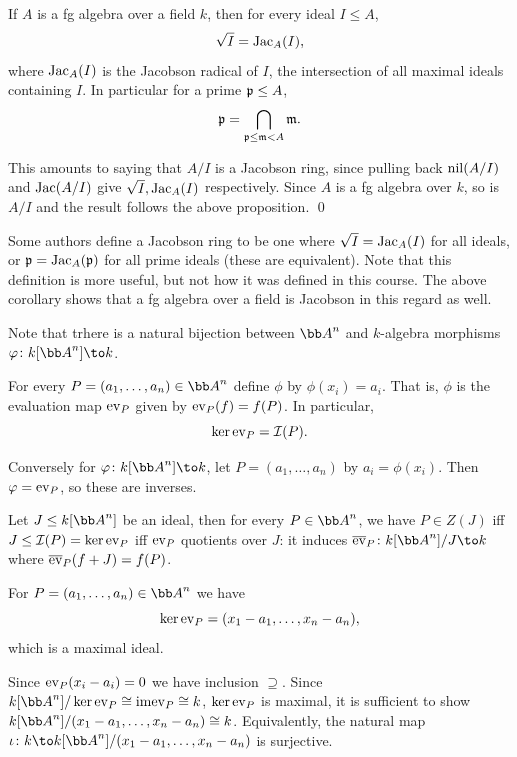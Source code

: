 \eproof

\bcoro

    If $A$ is a fg algebra over a field $k$, then for every ideal $I\leq A$,
    $$ \sqrt I = {\rm Jac}_A(I) , $$
    where ${\rm Jac}_A(I)$ is the Jacobson radical of $I$, the intersection of all maximal ideals containing $I$.
    In particular for a prime ${{\frak p}}\leq A$,
    $$ {{\frak p}} = \bigcap_{{{\frak p}}\leq{{\frak m}}<A}{{\frak m}} . $$

\ecoro

\bproof

    This amounts to saying that $A/I$ is a Jacobson ring, since pulling back ${\rm nil}(A/I)$ and ${\rm Jac}(A/I)$ give $\sqrt I,{\rm Jac}_A(I)$ respectively.
    Since $A$ is a fg algebra over $k$, so is $A/I$ and the result follows the above proposition.
    \qed

\eproof

\bnote

    Some authors define a Jacobson ring to be one where $\sqrt I={\rm Jac}_A(I)$ for all ideals, or ${{\frak p}}={\rm Jac}_A({{\frak p}})$ for all prime ideals (these are equivalent).
    Note that this definition is more useful, but not how it was defined in this course.
    The above corollary shows that a fg algebra over a field is Jacobson in this regard as well.

\enote

Note that trhere is a natural bijection between $\bA^n$ and $k$-algebra morphisms $\phi\colon k[\bA^n]\to k$.
\benum
    \item For every $P=(a_1,\dots,a_n)\in\bA^n$ define $\phi$ by $\phi(x_i)=a_i$.
    That is, $\phi$ is the evaluation map ${\rm ev}_P$ given by ${\rm ev}_P(f)=f(P)$.
    In particular,
    $$ \mathop{\rm ker}{\rm ev}_P = {{\cal I}}(P) . $$
    \item Conversely for $\phi\colon k[\bA^n]\to k$, let $P=(a_1,\dots,a_n)$ by $a_i=\phi(x_i)$.
    Then $\varphi={\rm ev}_P$, so these are inverses.
\eenum

Let $J\leq k[\bA^n]$ be an ideal, then for every $P\in\bA^n$, we have $P\in Z(J)$ iff $J\leq{{\cal I}}(P)=\mathop{\rm ker}{\rm ev}_P$ iff
${\rm ev}_P$ quotients over $J$: it induces $\bar\ev_P\colon k[\bA^n]/J\to k$ where ${\overline{{\rm ev}}}_P(f+J)=f(P)$.

\bprop

    For $P=(a_1,\dots,a_n)\in\bA^n$ we have
    $$ \mathop{\rm ker}{\rm ev}_P = (x_1-a_1,\dots,x_n-a_n) , $$
    which is a maximal ideal.

\eprop

\bproof

    Since ${\rm ev}_P(x_i-a_i)=0$ we have inclusion $\supseteq$.
    Since $k[\bA^n]/\ker\ev_P\cong\im\ev_P\cong k$, $\mathop{\rm ker}{\rm ev}_P$ is maximal, it is sufficient to show $k[\bA^n]/(x_1-a_1,\dots,x_n-a_n)\cong k$.
    Equivalently, the natural map $\iota\colon k\to k[\bA^n]/(x_1-a_1,\dots,x_n-a_n)$ is surjective.

